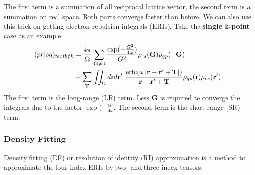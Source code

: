 \documentclass{article}
\begin{document}
            The first term is a summation of all reciprocal lattice vector,
            the second term is a summation on real space.
            Both parts converge faster than before.
            We can also use this trick on getting electron repulsion integrals (ERIs).
            Take the \textbf{single k-point} case as an example
            \begin{align}
                (pr|sq)_{textbf{k}} &= \frac{4\pi}{\Omega}\sum_{\textbf{G}\neq 0}
                \frac{\exp(-\frac{G^2}{4\omega})}{G^2}\rho_{rs}(\textbf{G})\rho_{qp}(-\textbf{G})\notag\\
                &+ \sum_{\textbf{T}}\iint_{\Omega}d\textbf{r}d\textbf{r}'\ 
                \frac{{\rm erfc}(\omega\left|\textbf{r}-\textbf{r}'+\textbf{T}\right|)}{\left|\textbf{r}-\textbf{r}'+\textbf{T}\right|}
                \rho_{qp}(\textbf{r})\rho_{rs}(\textbf{r}')
            \end{align}
            The first term is the long-range (LR) term.
            Less $\textbf{G}$ is required to converge the integrals due to the factor $\exp(-\frac{G^2}{4\omega}$.
            The second term is the short-range (SR) term.
            
            

        
        \subsubsection{Density Fitting}
            Density fitting (DF) or resolution of identity (RI) approximation is a method to approximate the four-index ERIs by two- and three-index tensors.


            
\end{document}
